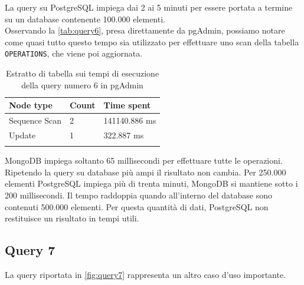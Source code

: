 \noindent La query su PostgreSQL impiega dai 2 ai 5 minuti per essere portata a termine su un database contenente 100.000 elementi.\\
Osservando la \autoref{tab:query6}, presa direttamente da pgAdmin, possiamo notare come quasi tutto questo tempo sia utilizzato per effettuare uno scan della tabella \texttt{OPERATIONS}, che viene poi aggiornata.\\

\begin{table}
\begin{center} 
    \renewcommand{\arraystretch}{1.5}
    
    \centering
    \begin{longtable}{| C{2.5cm} | C{4cm} | C{4cm} |}
        
        \hline
        
        \textbf{Node type} & \textbf{Count} & \textbf{Time spent} \\
        
        \hline
        Sequence Scan & 2 & 141140.886 ms \\
        \hline 
        Update & 1 & 322.887 ms \\
        \hline
        
        \caption{Estratto di tabella sui tempi di esecuzione della query numero 6 in pgAdmin}
        \label{tab:query6}
    \end{longtable}
\end{center}
\end{table}

\noindent MongoDB impiega soltanto 65 millisecondi per effettuare tutte le operazioni.\\
Ripetendo la query su database più ampi il risultato non cambia. Per 250.000 elementi PostgreSQL impiega più di trenta minuti, MongoDB si mantiene sotto i 200 millisecondi. Il tempo raddoppia quando all'interno del database sono contenuti 500.000 elementi. Per questa quantità di dati, PostgreSQL non restituisce un risultato in tempi utili.\\


\subsection{Query 7}
La query riportata in \autoref{fig:query7} rappresenta un altro caso d'uso importante.

